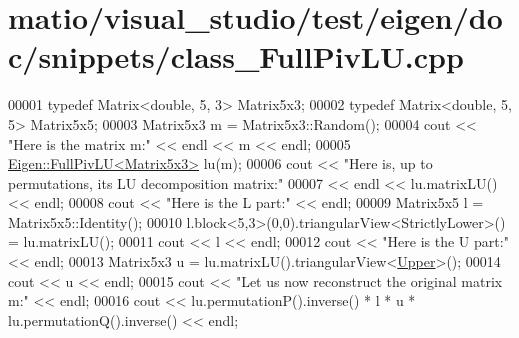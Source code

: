 \hypertarget{matio_2visual__studio_2test_2eigen_2doc_2snippets_2class___full_piv_l_u_8cpp_source}{}\section{matio/visual\+\_\+studio/test/eigen/doc/snippets/class\+\_\+\+Full\+Piv\+LU.cpp}
\label{matio_2visual__studio_2test_2eigen_2doc_2snippets_2class___full_piv_l_u_8cpp_source}

\begin{DoxyCode}
00001 \textcolor{keyword}{typedef} Matrix<double, 5, 3> Matrix5x3;
00002 \textcolor{keyword}{typedef} Matrix<double, 5, 5> Matrix5x5;
00003 Matrix5x3 m = Matrix5x3::Random();
00004 cout << \textcolor{stringliteral}{"Here is the matrix m:"} << endl << m << endl;
00005 \hyperlink{group___l_u___module_class_eigen_1_1_full_piv_l_u}{Eigen::FullPivLU<Matrix5x3>} lu(m);
00006 cout << \textcolor{stringliteral}{"Here is, up to permutations, its LU decomposition matrix:"}
00007      << endl << lu.matrixLU() << endl;
00008 cout << \textcolor{stringliteral}{"Here is the L part:"} << endl;
00009 Matrix5x5 l = Matrix5x5::Identity();
00010 l.block<5,3>(0,0).triangularView<StrictlyLower>() = lu.matrixLU();
00011 cout << l << endl;
00012 cout << \textcolor{stringliteral}{"Here is the U part:"} << endl;
00013 Matrix5x3 u = lu.matrixLU().triangularView<\hyperlink{group__enums_gga39e3366ff5554d731e7dc8bb642f83cda6bcb58be3b8b8ec84859ce0c5ac0aaec}{Upper}>();
00014 cout << u << endl;
00015 cout << \textcolor{stringliteral}{"Let us now reconstruct the original matrix m:"} << endl;
00016 cout << lu.permutationP().inverse() * l * u * lu.permutationQ().inverse() << endl;
\end{DoxyCode}
